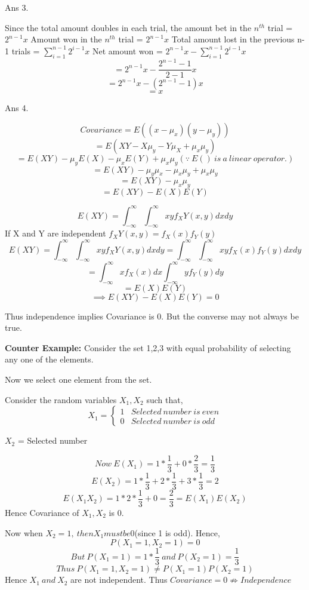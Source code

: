 \documentclass[11pt]{article}
\begin{document}
Ans 3.\begin{center}
Since the total amount doubles in each trial, the amount bet in the $n^{th}$ trial = $2^{n-1}x$\linebreak
Amount won in the $n^{th}$ trial = $2^{n-1}x$
Total amount lost in the previous n-1 trials = $\sum\limits_{i=1}^{n-1}2^{i-1}x$
Net amount won = $2^{n-1}x-\sum\limits_{i=1}^{n-1}2^{i-1}x$
$$=2^{n-1}x-\frac{2^{n-1}-1}{2-1}x$$
$$=2^{n-1}x - (2^{n-1}-1)x$$
$$=x$$
\newline
\newline
\end{center}

Ans 4.\begin{center}
$$Covariance = E((x-\mu_x)(y-\mu_y))$$
$$=E(XY - X\mu_y - Y\mu_X + \mu_x\mu_y)$$
$$=E(XY) - \mu_yE(X) - \mu_xE(Y) + \mu_x\mu_y(\because\ E()\ is\ a\ linear\ operator.)$$
$$=E(XY) - \mu_y\mu_x - \mu_x\mu_y + \mu_x\mu_y$$
$$=E(XY) - \mu_x\mu_y$$
$$=E(XY) - E(X)E(Y)$$

$$E(XY) = \int_{-\infty}^{\infty}\int_{-\infty}^{\infty}xyf_XY(x,y)dxdy$$
If X and Y are independent $f_XY(x,y) = f_X(x)f_Y(y)$
$$E(XY) = \int_{-\infty}^{\infty}\int_{-\infty}^{\infty}xyf_XY(x,y)dxdy = \int_{-\infty}^{\infty}\int_{-\infty}^{\infty}xyf_X(x)f_Y(y)dxdy$$
$$=\int_{-\infty}^{\infty}xf_X(x)dx\int_{-\infty}^{\infty}yf_Y(y)dy$$
$$=E(X)E(Y)$$
$$\implies E(XY) - E(X)E(Y) = 0$$

Thus independence implies Covariance is 0.
But the converse may not always be true.

\textbf{Counter Example:}
Consider the set {1,2,3} with equal probability of selecting any one of the elements.

Now we select one element from the set.

Consider the random variables $X_1,X_2$ such that,
\[
X_1 = 
   \begin{cases} 
      1 &  Selected\ number\ is\ even\\
      0 & Selected\ number\ is\ odd 
   \end{cases}
\]

$X_2$ = Selected number

$$Now\ E(X_1)=1*\frac{1}{3} + 0*\frac{2}{3}=\frac{1}{3}$$
$$E(X_2)=1*\frac{1}{3}+2*\frac{1}{3}+3*\frac{1}{3}=2$$
$$E(X_1X_2) = 1*2*\frac{1}{3} + 0=\frac{2}{3} = E(X_1)E(X_2)$$
Hence Covariance of $X_1, X_2$ is 0.

Now when $X_2=1,\ then X_1 must be 0$(since 1 is odd). Hence,
$$P(X_1=1, X_2=1) = 0$$
$$But\ P(X_1=1) = 1*\frac{1}{3}\ and\ P(X_2=1)=\frac{1}{3}$$
$$Thus\  P(X_1=1, X_2=1) \neq P(X_1=1)P(X_2=1)$$
Hence $X_1\ and\ X_2$ are not independent.
Thus $Covariance = 0 \not \Rightarrow Independence$

\end{center}
\end{document}
